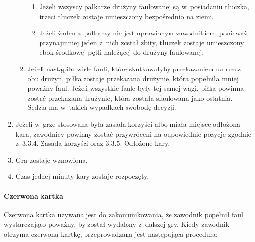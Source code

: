 \documentclass[12pt]{article}
\begin{document}
\begin{enumerate}
\begin{enumerate}
		            \begin{enumerate}
			            \item
			                  Jeżeli wszyscy pałkarze drużyny faulowanej są w~posiadaniu
			                  tłuczka, trzeci tłuczek zostaje umieszczony bezpośrednio na ziemi.
			            \item
			                  Jeżeli żaden z~pałkarzy nie jest uprawionym zawodnikiem, ponieważ
			                  przynajmniej jeden z~nich został zbity, tłuczek zostaje
			                  umieszczony obok środkowej pętli należącej do drużyny faulowanej.
		            \end{enumerate}
		      \item
		            Jeżeli nastąpiło wiele fauli, które skutkowałyby przekazaniem na
		            rzecz obu drużyn, piłka zostaje przekazana drużynie, która popełniła
		            mniej poważny faul. Jeżeli wszystkie faule były tej samej wagi,
		            piłka powinna zostać przekazana drużynie, która została sfaulowana
		            jako ostatnia. Sędzia ma w~takich wypadkach swobodę decyzji.
	      \end{enumerate}
	\item
	      Jeżeli w~grze stosowana była zasada korzyści albo miała miejsce
	      odłożona kara, zawodnicy powinny zostać przywróceni na odpowiednie
	      pozycje zgodnie z~3.3.4. Zasada korzyści oraz 3.3.5. Odłożone kary.
	\item
	      Gra zostaje wznowiona.
	\item
	      Czas jednej minuty kary zostaje rozpoczęty.
\end{enumerate}

\paragraph{Czerwona kartka}
Czerwona kartka używana jest do
zakomunikowania, że zawodnik popełnił faul wystarczająco poważny, by
został wydalony z~dalszej gry. Kiedy zawodnik otrzyma czerwoną kartkę,
przeprowadzana jest następująca procedura:
\end{document}
